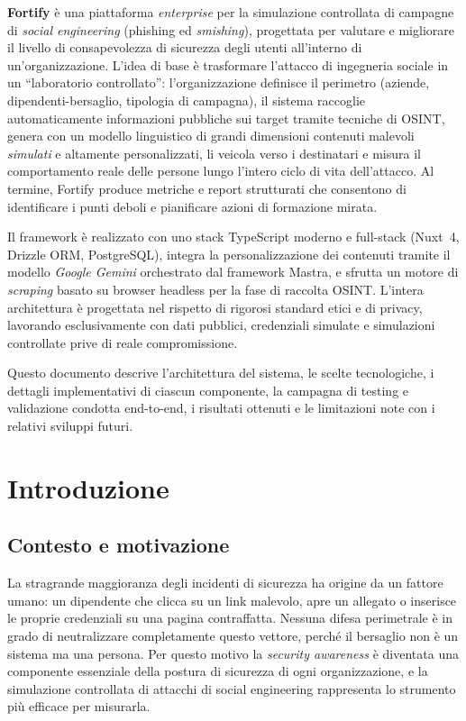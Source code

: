 \documentclass[12pt,a4paper,oneside]{report}
\begin{document}
\textbf{Fortify} \`e una piattaforma \emph{enterprise} per la simulazione controllata
di campagne di \emph{social engineering} (phishing ed \emph{smishing}), progettata
per valutare e migliorare il livello di consapevolezza di sicurezza degli utenti
all'interno di un'organizzazione. L'idea di base \`e trasformare l'attacco di
ingegneria sociale in un ``laboratorio controllato'': l'organizzazione definisce il
perimetro (aziende, dipendenti-bersaglio, tipologia di campagna), il sistema raccoglie
automaticamente informazioni pubbliche sui target tramite tecniche di OSINT, genera con
un modello linguistico di grandi dimensioni contenuti malevoli \emph{simulati} e
altamente personalizzati, li veicola verso i destinatari e misura il comportamento reale
delle persone lungo l'intero ciclo di vita dell'attacco. Al termine, Fortify produce
metriche e report strutturati che consentono di identificare i punti deboli e pianificare
azioni di formazione mirata.

Il framework \`e realizzato con uno stack TypeScript moderno e full-stack
(Nuxt~4, Drizzle ORM, PostgreSQL), integra la personalizzazione dei contenuti tramite
il modello \emph{Google Gemini} orchestrato dal framework Mastra, e sfrutta un motore di
\emph{scraping} basato su browser headless per la fase di raccolta OSINT. L'intera
architettura \`e progettata nel rispetto di rigorosi standard etici e di privacy,
lavorando esclusivamente con dati pubblici, credenziali simulate e simulazioni
controllate prive di reale compromissione.

Questo documento descrive l'architettura del sistema, le scelte tecnologiche, i dettagli
implementativi di ciascun componente, la campagna di testing e validazione condotta
end-to-end, i risultati ottenuti e le limitazioni note con i relativi sviluppi futuri.

\tableofcontents
\listoffigures
\listoftables
\clearpage

\chapter{Introduzione}

\section{Contesto e motivazione}
La stragrande maggioranza degli incidenti di sicurezza ha origine da un fattore umano:
un dipendente che clicca su un link malevolo, apre un allegato o inserisce le proprie
credenziali su una pagina contraffatta. Nessuna difesa perimetrale \`e in grado di
neutralizzare completamente questo vettore, perch\'e il bersaglio non \`e un sistema ma
una persona. Per questo motivo la \emph{security awareness} \`e diventata una componente
essenziale della postura di sicurezza di ogni organizzazione, e la simulazione controllata
di attacchi di social engineering rappresenta lo strumento pi\`u efficace per misurarla.
\end{document}
